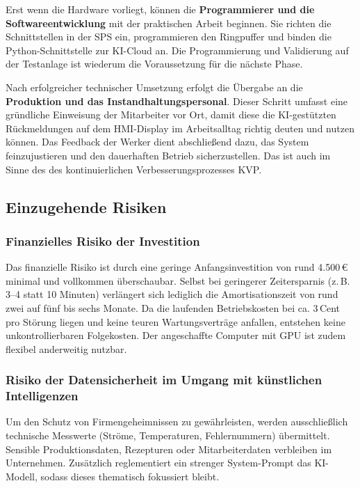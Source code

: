 Erst wenn die Hardware vorliegt, können die \textbf{Programmierer und die Softwareentwicklung} mit der praktischen Arbeit beginnen.
Sie richten die Schnittstellen in der SPS ein, programmieren den Ringpuffer und binden die Python-Schnittstelle zur KI-Cloud an. 
Die Programmierung und Validierung auf der Testanlage ist wiederum die Voraussetzung für die nächste Phase.

Nach erfolgreicher technischer Umsetzung erfolgt die Übergabe an die \textbf{Produktion und das Instandhaltungspersonal}. 
Dieser Schritt umfasst eine gründliche Einweisung der Mitarbeiter vor Ort, damit diese die KI-gestützten Rückmeldungen auf 
dem HMI-Display im Arbeitsalltag richtig deuten und nutzen können. Das Feedback der Werker dient abschließend dazu,
das System feinzujustieren und den dauerhaften Betrieb sicherzustellen. Das ist auch im Sinne des des kontinuierlichen Verbesserungsprozesses KVP.

\subsection{Einzugehende Risiken}

\subsubsection*{Finanzielles Risiko der Investition}
Das finanzielle Risiko ist durch eine geringe Anfangsinvestition von rund 4.500\,€ minimal und vollkommen überschaubar. Selbst bei geringerer Zeitersparnis (z.\,B. 3--4 statt 10 Minuten) verlängert sich lediglich die Amortisationszeit von rund zwei auf fünf bis sechs Monate. Da die laufenden Betriebskosten bei ca. 3\,Cent pro Störung liegen und keine teuren Wartungsverträge anfallen, entstehen keine unkontrollierbaren Folgekosten. Der angeschaffte Computer mit GPU ist zudem flexibel anderweitig nutzbar.

\subsubsection*{Risiko der Datensicherheit im Umgang mit künstlichen Intelligenzen}
Um den Schutz von Firmengeheimnissen zu gewährleisten, werden ausschließlich technische Messwerte (Ströme, Temperaturen, Fehlernummern) übermittelt. Sensible Produktionsdaten, Rezepturen oder Mitarbeiterdaten verbleiben im Unternehmen. Zusätzlich reglementiert ein strenger System-Prompt das KI-Modell, sodass dieses thematisch fokussiert bleibt.


